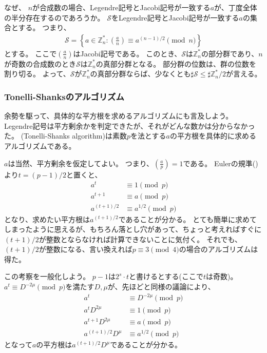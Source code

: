 
なぜ、 $n$が合成数の場合、Legendre記号とJacobi記号が一致する$a$が、丁度全体の半分存在するのであろうか。
$\mathcal{S}$をLegendre記号とJacobi記号が一致する$a$の集合とする。
つまり、
\begin{align*}
\mathcal{S} = \left\{a \in \mathbb{Z}_n^* : \left(\frac{a}{n}\right) \equiv a^{(n-1)/2} \pmod{n}\right\}
\end{align*}
とする。
ここで$ \left(\frac{a}{n}\right)$はJacobi記号である。
このとき、$\mathcal{S}$は$\mathbb{Z}_n^*$の部分群であり、$n$が奇数の合成数のとき$\mathcal{S}$は$\mathbb{Z}_n^*$の真部分群となる。
部分群の位数は、群の位数を割り切る。
よって、$\mathcal{S}$が$\mathbb{Z}_n^*$の真部分群ならば、少なくとも$\sharp\mathcal{S}\le\sharp\mathbb{Z}_n^*/2$が言える。

\subsubsection{Tonelli-Shanksのアルゴリズム}
余勢を駆って、具体的な平方根を求めるアルゴリズムにも言及しよう。
Legendre記号は平方剰余かを判定できたが、それがどんな数かは分からなかった。
(Tonelli-Shanks algorithm)は素数$p$を法とする$a$の平方根を具体的に求めるアルゴリズムである。

$a$は当然、平方剰余を仮定してよい。
つまり、$\left(\frac{a}{p}\right)=1$である。
Eulerの規準()より$t=(p-1)/2$と置くと、
\begin{align*}
a^t &\equiv 1 \pmod{p}\\
a^{t+1} &\equiv a \pmod{p}\\
a^{(t+1)/2} &\equiv a^{1/2} \pmod{p}
\end{align*}
となり、求めたい平方根は$a^{(t+1)/2}$であることが分かる。
とても簡単に求めてしまったように思えるが、もちろん落とし穴があって、ちょっと考えればすぐに$(t+1)/2$が整数とならなければ計算できないことに気付く。
それでも、$(t+1)/2$が整数になる、言い換えれば$p\equiv3\pmod{4}$の場合のアルゴリズムは得た。

この考察を一般化しよう。
$p-1$は$2^s\cdot t$と書けるとする(ここで$t$は奇数)。
$a^t \equiv D^{-2\mu}\pmod{p}$を満たす$D,\mu$が、先ほどと同様の議論により、
\begin{align*}
a^t &\equiv D^{-2\mu}\pmod{p}\\
a^tD^{2\mu} &\equiv 1 \pmod{p}\\
a^{t+1}D^{2\mu} &\equiv a \pmod{p}\\
a^{(t+1)/2}D^{\mu} &\equiv a^{1/2} \pmod{p}
\end{align*}
となって$a$の平方根は$a^{(t+1)/2}D^{\mu}$であることが分かる。

